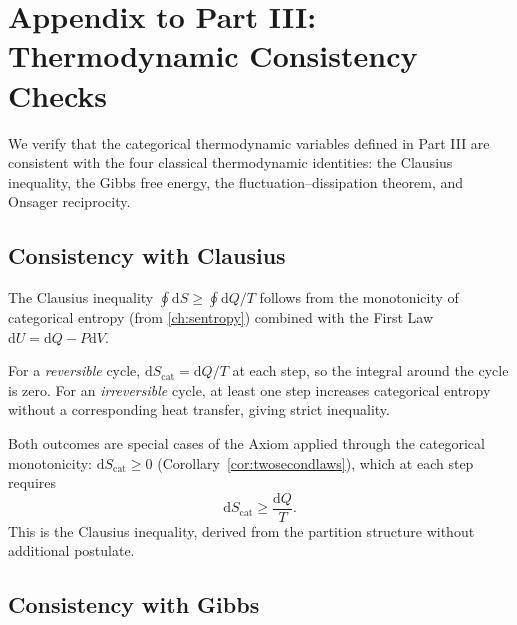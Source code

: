 \section*{Appendix to Part III: Thermodynamic Consistency Checks}

We verify that the categorical thermodynamic variables defined in Part III
are consistent with the four classical thermodynamic identities: the
Clausius inequality, the Gibbs free energy, the fluctuation--dissipation
theorem, and Onsager reciprocity.

\subsection{Consistency with Clausius}

The Clausius inequality $\oint \mathrm{d}S \ge \oint \mathrm{d}Q/T$ follows
from the monotonicity of categorical entropy (from \cref{ch:sentropy})
combined with the First Law $\mathrm{d}U = \mathrm{d}Q - P\mathrm{d}V$.

For a \emph{reversible} cycle, $\mathrm{d}S_{\mathrm{cat}} = \mathrm{d}Q/T$
at each step, so the integral around the cycle is zero.  For an
\emph{irreversible} cycle, at least one step increases categorical entropy
without a corresponding heat transfer, giving strict inequality.

Both outcomes are special cases of the Axiom applied through the categorical
monotonicity: $\mathrm{d}S_{\mathrm{cat}} \ge 0$ (Corollary~\ref{cor:twosecondlaws}),
which at each step requires
\[
  \mathrm{d}S_{\mathrm{cat}} \ge \frac{\mathrm{d}Q}{T}.
\]
This is the Clausius inequality, derived from the partition structure
without additional postulate.

\subsection{Consistency with Gibbs}

